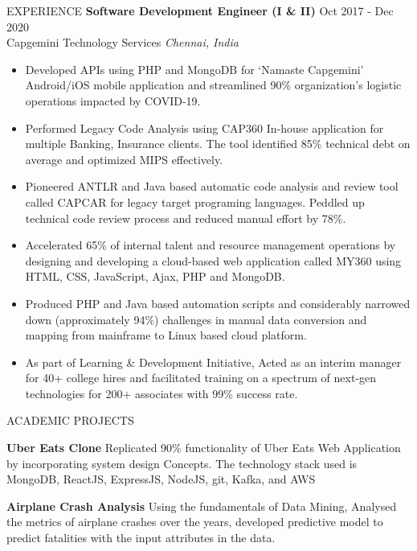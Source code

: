 \documentclass{resume} %
\begin{document}
\begin{rSection}{EXPERIENCE}
\vspace{-0.5em}
\textbf{Software Development Engineer (I \& II)} \hfill Oct  2017 - Dec 2020\\
Capgemini Technology Services \hfill \textit{Chennai, India}
 \begin{itemize}
    \itemsep -6pt {} 
     \item Developed APIs using PHP and MongoDB for ‘Namaste Capgemini’ Android/iOS mobile application and streamlined 90\% organization’s logistic operations impacted by COVID-19.
     \item 	Performed Legacy Code Analysis using CAP360 In-house application for multiple Banking, Insurance clients. The tool identified 85\% technical debt on average and optimized MIPS effectively. 
     \item Pioneered ANTLR and Java based automatic code analysis and review tool called CAPCAR for legacy target programing languages. Peddled up technical code review process and reduced manual effort by 78\%.
     \item Accelerated 65\% of internal talent and resource management operations by designing and developing a cloud-based web application called MY360 using HTML, CSS, JavaScript, Ajax, PHP and MongoDB.
     \item Produced PHP and Java based automation scripts and considerably narrowed down (approximately 94\%) challenges in manual data conversion and mapping from mainframe to Linux based cloud platform.
     \item As part of Learning \& Development Initiative, Acted as an interim manager for 40+ college hires and facilitated training on a spectrum of next-gen technologies for 200+ associates with 99\% success rate.
 \end{itemize}

\end{rSection} 

\vspace{-0.5em}
\begin{rSection}{ACADEMIC PROJECTS}
\vspace{-1.5em}
\item \textbf{Uber Eats Clone}  {Replicated 90\%  functionality of Uber Eats Web Application by  incorporating system design  Concepts. The technology stack used is MongoDB, ReactJS, ExpressJS, NodeJS, git, Kafka, and AWS  }
  \vspace{-0.1em}
\item \textbf{Airplane Crash Analysis}  {Using the fundamentals of Data Mining, Analysed the metrics of airplane crashes over the years, developed predictive model to predict fatalities with the input attributes in the data.}
  \vspace{-0.2em}
\end{rSection} 
\end{document}
